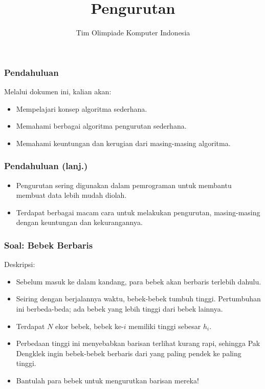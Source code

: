 

\title{Pengurutan}
\author{Tim Olimpiade Komputer Indonesia}
\date{}



\begin{frame}
\titlepage
\end{frame}

\begin{frame}
\frametitle{Pendahuluan}
Melalui dokumen ini, kalian akan:
\begin{itemize}
  \item Mempelajari konsep algoritma sederhana.
  \item Memahami berbagai algoritma pengurutan sederhana.
  \item Memahami keuntungan dan kerugian dari masing-masing algoritma.
\end{itemize}
\end{frame}

\begin{frame}
\frametitle{Pendahuluan (lanj.)}
\begin{itemize}
  \item Pengurutan sering digunakan dalam pemrograman untuk membantu membuat data lebih mudah diolah.
  \item Terdapat berbagai macam cara untuk melakukan pengurutan,
  masing-masing dengan keuntungan dan kekurangannya.
\end{itemize}
\end{frame}

\begin{frame}
\frametitle{Soal: Bebek Berbaris}
Deskripsi:
\begin{itemize}
  \item Sebelum masuk ke dalam kandang, para bebek akan berbaris terlebih dahulu.
  \item Seiring dengan berjalannya waktu, bebek-bebek tumbuh tinggi. Pertumbuhan ini berbeda-beda; ada bebek yang lebih tinggi dari bebek lainnya.
  \item Terdapat $N$ ekor bebek, bebek ke-$i$ memiliki tinggi sebesar $h_i$.
  \item Perbedaan tinggi ini menyebabkan barisan terlihat kurang rapi, sehingga Pak Dengklek ingin bebek-bebek berbaris dari yang paling pendek ke paling tinggi.
  \item Bantulah para bebek untuk mengurutkan barisan mereka!
\end{itemize}
\end{frame}

